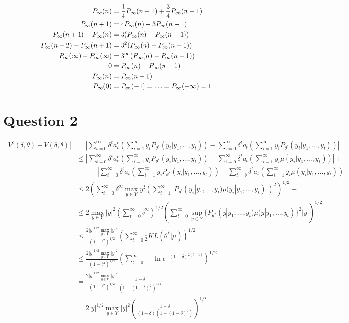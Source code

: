 \documentclass{article}
\begin{document}
\[
\begin{split}
  P_{\infty}(n)            & = \frac{1}{4}P_{\infty}(n + 1) + \frac{3}{4}P_{\infty}(n - 1) \\
  P_{\infty}(n + 1)        & = 4P_{\infty}(n) - 3P_{\infty}(n-1) \\
  P_{\infty}(n + 1)-P_{\infty}(n) & = 3(P_{\infty}(n) - P_{\infty}(n-1)) \\
  P_{\infty}(n + 2)-P_{\infty}(n+1)&= 3^2(P_{\infty}(n) - P_{\infty}(n-1)) \\
  P_{\infty}(\infty)-P_{\infty}(\infty)&= 3^\infty(P_{\infty}(n) - P_{\infty}(n-1)) \\
  0                 & = P_{\infty}(n) - P_{\infty}(n-1) \\
  P_{\infty}(n)            & = P_{\infty}(n-1) \\
  P_{\infty}(0)            & = P_{\infty}(-1) = \ldots = P_{\infty}(-\infty) = 1 \\
\end{split}
\]


\section{Question 2}
\label{sec:Question 2}

\newcommand{\sumt}{\sum_{t=0}^\infty}
\newcommand{\sumi}{\sum_{i=1}^\infty}
\newcommand{\Pth}{P_{\theta^*}(y_i|y_1, \ldots, y_t)}
\newcommand{\muth}{\mu(y_i|y_1, \ldots, y_t)}
\[
  \begin{split}
  |V^c(\delta, \theta) - V(\delta, \theta)| & = \left|
      \sumt \delta^t a^c_t \left(\sumi y_i \Pth\right) - 
          \sumt \delta^t a_t \left(\sumi y_i \Pth\right)
          \right| \\
    & \le \left|
        \sumt \delta^t a^c_t \left(\sumi y_i \Pth\right) - 
            \sumt \delta^t a_t \left(\sumi y_i \muth\right)
            \right| + \\ 
      & \qquad\quad \left|
        \sumt \delta^t a_t \left(\sumi y_i \Pth\right) - 
            \sumt \delta^t a_t \left(\sumi y_i \muth\right)
            \right| \\
    & \le 2\left(
        \sumt \delta^{2t} \max_{y \in Y} y^2
            \left(\sumi |\Pth \muth|\right)^2\right)^{1/2} + \\
    & \le 2\max_{y \in Y} |y|^2 \left(\sumt \delta^{2t}\right)^{1/2} 
        \left(\sumt \sup_{y \in Y}\{
            P_{\theta^*}(y|y_1, \ldots, y_t)
            \mu(y|y_1, \ldots, y_t)\}^2 |y|\right)^{1/2} \\
    & \le \frac{2|y|^{1/2}\max_{y \in Y} |y|^2}{(1 - \delta^2)^{1/2}} 
          \left(\sumt \frac{1}{2}KL(\theta^*|\mu)\right)^{1/2} \\
    & \le \frac{2|y|^{1/2}\max_{y \in Y} |y|^2}{(1 - \delta^2)^{1/2}} 
          \left(\sumt -\ln e^{-(1 -\delta)^{2(t+1)}}\right)^{1/2} \\
    & = \frac{2|y|^{1/2}\max_{y \in Y} |y|^2}{(1 - \delta^2)^{1/2}} 
          \frac{1 -\delta}{(1 - (1 - \delta)^2)^{1/2}} \\
    & = 2|y|^{1/2}\max_{y \in Y} |y|^2
          \left(\frac{1 -\delta}{(1 + \delta)(1 - (1 - \delta)^2)}\right)^{1/2} \\
  \end{split}
\]
\end{document}
